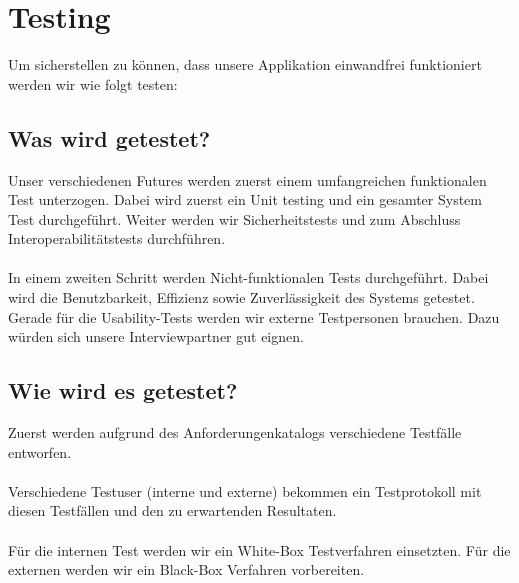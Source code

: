 \chapter{Testing}

Um sicherstellen zu können, dass unsere Applikation einwandfrei funktioniert werden wir wie folgt testen:

\section{Was wird getestet?}

Unser verschiedenen Futures werden zuerst einem umfangreichen funktionalen Test unterzogen. Dabei wird zuerst ein Unit testing und ein gesamter System Test durchgeführt. Weiter werden wir Sicherheitstests und zum Abschluss Interoperabilitätstests durchführen. \\ \\
In einem zweiten Schritt werden Nicht-funktionalen Tests durchgeführt. Dabei wird die Benutzbarkeit, Effizienz sowie Zuverlässigkeit des Systems getestet. Gerade für die Usability-Tests werden wir externe Testpersonen brauchen. Dazu würden sich unsere Interviewpartner gut eignen.

\section{Wie wird es getestet?}

Zuerst werden aufgrund des Anforderungenkatalogs verschiedene Testfälle entworfen. \\ \\
Verschiedene Testuser (interne und externe) bekommen ein Testprotokoll mit diesen Testfällen und den zu erwartenden Resultaten. \\ \\ 
Für die internen Test werden wir ein White-Box Testverfahren einsetzten. Für die externen werden wir ein Black-Box Verfahren vorbereiten.
